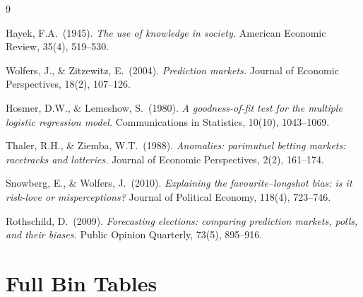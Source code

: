 \documentclass[11pt,a4paper]{article}
\begin{document}
\begin{thebibliography}{9}

Hayek, F.A.\ (1945).
\textit{The use of knowledge in society.}
American Economic Review, 35(4), 519--530.

Wolfers, J., \& Zitzewitz, E.\ (2004).
\textit{Prediction markets.}
Journal of Economic Perspectives, 18(2), 107--126.

Hosmer, D.W., \& Lemeshow, S.\ (1980).
\textit{A goodness-of-fit test for the multiple logistic regression model.}
Communications in Statistics, 10(10), 1043--1069.

Thaler, R.H., \& Ziemba, W.T.\ (1988).
\textit{Anomalies: parimutuel betting markets: racetracks and lotteries.}
Journal of Economic Perspectives, 2(2), 161--174.

Snowberg, E., \& Wolfers, J.\ (2010).
\textit{Explaining the favourite--longshot bias: is it risk-love or
misperceptions?}
Journal of Political Economy, 118(4), 723--746.

Rothschild, D.\ (2009).
\textit{Forecasting elections: comparing prediction markets, polls, and
their biases.}
Public Opinion Quarterly, 73(5), 895--916.

\end{thebibliography}

\appendix
\section{Full Bin Tables}
\end{document}
